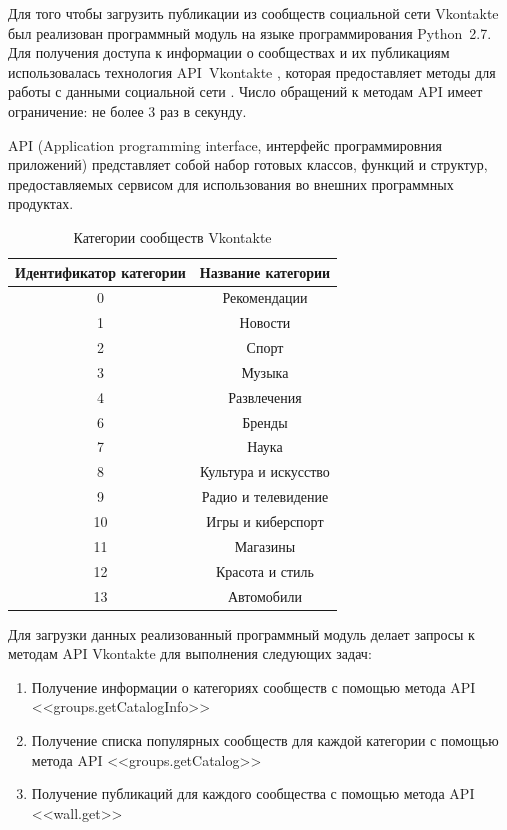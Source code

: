 \documentclass[a4paper]{report}
\begin{document}
	
	Для того чтобы загрузить публикации из сообществ социальной сети Vkontakte был реализован программный модуль на языке программирования Python~2.7. 
	Для получения доступа к информации о сообществах и их публикациям использовалась технология API~Vkontakte \cite{bib:vkapi}, которая предоставляет методы для работы с данными социальной сети \cite{bib:methods}. Число обращений к методам API имеет ограничение: не более 3 раз в секунду.
	
	API (Application programming interface, интерфейс программировния приложений) представляет собой набор готовых классов, функций и структур, предоставляемых сервисом для использования во внешних программных продуктах. 
	
	\setlength\extrarowheight{5pt}
\begin{table}[h]
\centering
\begin{tabular}{|c|c|}
\hline
\textbf{Идентификатор категории} & \textbf{Название категории} \\  \hline 
0 & Рекомендации \\ \hline
1 & Новости \\ \hline
2 & Спорт \\ \hline
3 & Музыка \\ \hline
4 & Развлечения \\ \hline
6 & Бренды \\ \hline
7 & Наука \\ \hline
8 & Культура и искусство \\ \hline
9 & Радио и телевидение \\ \hline
10 & Игры и киберспорт \\ \hline
11 & Магазины \\ \hline
12 & Красота и стиль \\ \hline
13 & Автомобили \\ \hline
\end{tabular}
\caption{Категории сообществ Vkontakte}
\label{table1}
\end{table}
	
	Для загрузки данных реализованный программный модуль делает запросы к методам API Vkontakte для выполнения следующих задач:
	
	\begin{enumerate}
	\item{Получение информации о категориях сообществ с помощью метода API <<groups.getCatalogInfo>>}
	\item{Получение списка популярных сообществ для каждой категории с помощью метода API <<groups.getCatalog>> }
	\item{Получение публикаций для каждого сообщества с помощью метода API <<wall.get>>}
	
	\end{enumerate}
	
\end{document}
